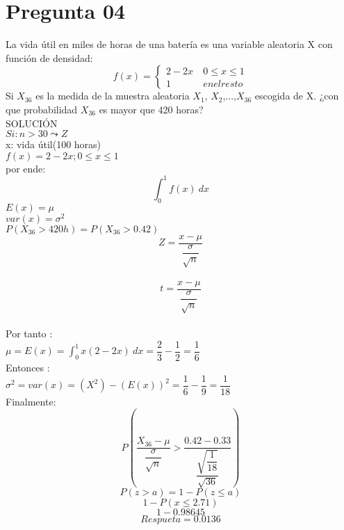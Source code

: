 \documentclass[10pt,a4paper]{article}
\begin{document}
\section{Pregunta 04}
La vida útil en miles de horas de una batería es una variable aleatoria X con función de densidad:
$$f(x) = \begin{cases}
2-2x & \ 0\leq x \leq 1\\  
1    & \ en el resto
\end{cases} $$
Si $X_{36}$ es la medida de la muestra aleatoria $X_{1}$, $X_{2}$,...,$X_{36}$ escogida de X.
¿con que probabilidad $X_{36}$ es mayor que 420 horas?\\
\newline
SOLUCIÓN\\
\newline
$Si: n>30 \leadsto Z$\\
\newline
x: vida útil(100 horas)\\
\newline
$f(x)=2-2x ; 0\leq x \leq1$\\
\newline
por ende:\\
$$\int_{0}^{1} f(x) \ dx $$
$E(x)=\mu$\\
$var(x)=\sigma^2$\\
$P(X_{36} > 420h) = P(X_{36} > 0.42)$\\
$$Z = \dfrac{x-\mu}{\dfrac{\sigma}{\sqrt{n}}}$$\\
$$t = \dfrac{x-\mu}{\dfrac{\sigma}{\sqrt{n}}}$$\\
Por tanto :\\
\newline
$\mu = E(x) = \int_{0}^{1} x(2-2x) \ dx = \dfrac{2}{3} - \dfrac{1}{2} = \dfrac{1}{6}$\\
\newline
Entonces :\\
\newline
$\sigma^2 = var(x) = (X^2) - (E(x))^2 = \dfrac{1}{6} - \dfrac{1}{9} = \dfrac{1}{18}$\\
\newline
Finalmente:\\
$$P(\dfrac{X_{36}-\mu}{\dfrac{\sigma}{\sqrt{n}}} > \dfrac{0.42 - 0.33}{\dfrac{\sqrt{\dfrac{1}{18}}}{\sqrt{36}}})$$
$$P(z > a) = 1 - P(z \leq a)$$
$$1 - P(x \leq 2.71)$$
$$1 - 0.98645$$
$$Respueta = 0.0136$$
\end{document}
